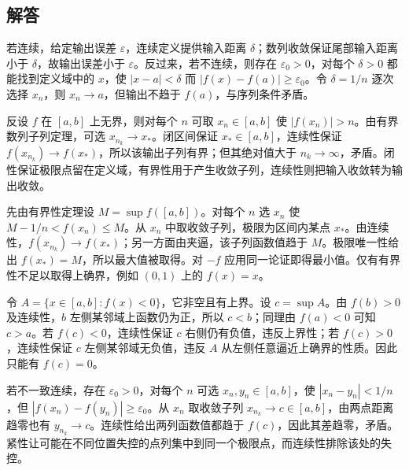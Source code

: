 \documentclass[12pt,fontset=fandol]{ctexart}
\begin{document}
\subsection{解答}
\begin{solve}\label{ans:c7q1}
若连续，给定输出误差 $\varepsilon$，连续定义提供输入距离 $\delta$；数列收敛保证尾部输入距离小于 $\delta$，故输出误差小于 $\varepsilon$。反过来，若不连续，则存在 $\varepsilon_0>0$，对每个 $\delta>0$ 都能找到定义域中的 $x$，使 $|x-a|<\delta$ 而 $|f(x)-f(a)|\ge\varepsilon_0$。令 $\delta=1/n$ 逐次选择 $x_n$，则 $x_n\to a$，但输出不趋于 $f(a)$，与序列条件矛盾。
\end{solve}

\begin{solve}\label{ans:c7q2}
反设 $f$ 在 $[a,b]$ 上无界，则对每个 $n$ 可取 $x_n\in[a,b]$ 使 $|f(x_n)|>n$。由有界数列子列定理，可选 $x_{n_k}\to x_*$。闭区间保证 $x_*\in[a,b]$，连续性保证 $f(x_{n_k})\to f(x_*)$，所以该输出子列有界；但其绝对值大于 $n_k\to\infty$，矛盾。闭性保证极限点留在定义域，有界性用于产生收敛子列，连续性则把输入收敛转为输出收敛。
\end{solve}

\begin{solve}\label{ans:c7q3}
先由有界性定理设 $M=\sup f([a,b])$。对每个 $n$ 选 $x_n$ 使 $M-1/n<f(x_n)\le M$。从 $x_n$ 中取收敛子列，极限为区间内某点 $x_*$。由连续性，$f(x_{n_k})\to f(x_*)$；另一方面由夹逼，该子列函数值趋于 $M$。极限唯一性给出 $f(x_*)=M$，所以最大值被取得。对 $-f$ 应用同一论证即得最小值。仅有有界性不足以取得上确界，例如 $(0,1)$ 上的 $f(x)=x$。
\end{solve}

\begin{solve}\label{ans:c7q4}
令 $A=\{x\in[a,b]:f(x)<0\}$，它非空且有上界。设 $c=\sup A$。由 $f(b)>0$ 及连续性，$b$ 左侧某邻域上函数仍为正，所以 $c<b$；同理由 $f(a)<0$ 可知 $c>a$。若 $f(c)<0$，连续性保证 $c$ 右侧仍有负值，违反上界性；若 $f(c)>0$，连续性保证 $c$ 左侧某邻域无负值，违反 $A$ 从左侧任意逼近上确界的性质。因此只能有 $f(c)=0$。
\end{solve}

\begin{solve}\label{ans:c7q5}
若不一致连续，存在 $\varepsilon_0>0$，对每个 $n$ 可选 $x_n,y_n\in[a,b]$，使 $|x_n-y_n|<1/n$，但 $|f(x_n)-f(y_n)|\ge\varepsilon_0$。从 $x_n$ 取收敛子列 $x_{n_k}\to c\in[a,b]$，由两点距离趋零也有 $y_{n_k}\to c$。连续性给出两列函数值都趋于 $f(c)$，因此其差趋零，矛盾。紧性让可能在不同位置失控的点列集中到同一个极限点，而连续性排除该处的失控。
\end{solve}
\end{document}
